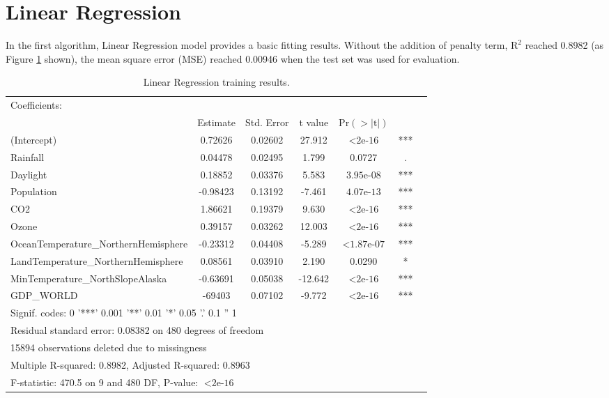 \section{Linear Regression} %

In the first algorithm, Linear Regression model provides a basic fitting results. Without the addition of penalty term, $\text{R}^2$ reached 0.8982 (as Figure \ref{4.2.1-LR-Training-Results} shown), the mean square error (MSE) reached 0.00946 when the test set was used for evaluation.

\begin{table}[htbp]
  \centering
  \footnotesize
  \begin{tabular}{p{5.75cm} | c c c c c c}
  \toprule
  Coefficients: \\ %
    & Estimate & Std. Error & t value & $\text{Pr}(>|\text{t}|)$\\
  \hline
  (Intercept) & 0.72626 & 0.02602 & 27.912 & $< \text{2e-16}$ & ***\\
  Rainfall & 0.04478 & 0.02495 & 1.799 & 0.0727 & .\\
  Daylight & 0.18852 & 0.03376 & 5.583 & $\text{3.95e-08}$ & ***\\
  Population & -0.98423 & 0.13192 & -7.461 & $\text{4.07e-13}$ & ***\\
  CO2 & 1.86621 & 0.19379 & 9.630 & $< \text{2e-16}$ & ***\\
  Ozone & 0.39157 & 0.03262 & 12.003 & $< \text{2e-16}$ & ***\\
  OceanTemperature\_NorthernHemisphere & -0.23312 & 0.04408 & -5.289 & $< \text{1.87e-07}$ & ***\\
  LandTemperature\_NorthernHemisphere & 0.08561 & 0.03910 & 2.190 & 0.0290 & *\\
  MinTemperature\_NorthSlopeAlaska & -0.63691 & 0.05038 & -12.642 & $< \text{2e-16}$ & ***\\
  GDP\_WORLD & -69403 & 0.07102 & -9.772 & $< \text{2e-16}$ & ***\\
  \hline
  \multicolumn{6}{l}{Signif. codes: 0 '***' 0.001 '**' 0.01 '*' 0.05 '.' 0.1 '' 1} \\
  \multicolumn{6}{l}{Residual standard error: 0.08382 on 480 degrees of freedom}\\
  \multicolumn{6}{l}{   15894 observations deleted due to missingness}\\
  \multicolumn{6}{l}{Multiple R-squared: 0.8982,      Adjusted R-squared: 0.8963}\\
  \multicolumn{6}{l}{F-statistic: 470.5 on 9 and 480 DF, P-value: $< \text{2e-16}$}\\
  \bottomrule
  \end{tabular}
  \caption{Linear Regression training results.}
  \label{4.2.1-LR-Training-Results}
\end{table}


